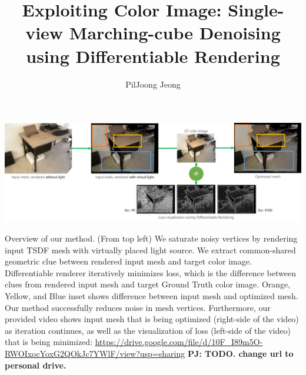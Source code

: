 \documentclass[acmtog]{acmart}
\newcommand{\PJ}[1]{\textcolor{CarnationPink}{\bfseries{PJ: {#1}}}}
\begin{document}
\title{Exploiting Color Image: Single-view Marching-cube Denoising using Differentiable Rendering}

\author{PilJoong Jeong}


\begin{teaserfigure}
    \includegraphics[width=\textwidth]{figures/0_teaser_overview_rev3.png}
    \caption{Overview of our method. (From top left) We saturate noisy vertices by rendering input TSDF mesh with virtually placed light source. We extract common-shared geometric clue between rendered input mesh and target color image. Differentiable renderer iteratively minimizes loss, which is the difference between clues from rendered input mesh and target Ground Truth color image. Orange, Yellow, and Blue inset shows difference between input mesh and optimized mesh. Our method successfully reduces noise in mesh vertices. Furthermore, our provided video shows input mesh that is being optimized (right-side of the video) as iteration continues, as well as the visualization of loss (left-side of the video) that is being minimized: \url{https://drive.google.com/file/d/10F_I89m5O-RWOIxocYoxG2QOkJc7YWlF/view?usp=sharing} \PJ{TODO. change url to personal drive.}}
    \label{fig:teaser}
\end{teaserfigure}
\end{document}
